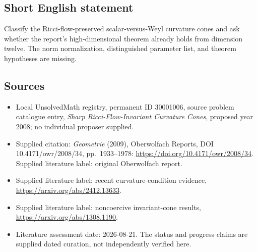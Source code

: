 \documentclass[11pt]{article}
\begin{document}
\subsection{Short English statement}
Classify the Ricci-flow-preserved scalar-versus-Weyl curvature cones and ask whether the report's high-dimensional theorem already holds from dimension twelve. The norm normalization, distinguished parameter list, and theorem hypotheses are missing.
\subsection{Sources}
\begin{itemize}\item Local UnsolvedMath registry, permanent ID 30001006, source problem catalogue entry, \emph{Sharp Ricci-Flow-Invariant Curvature Cones}, proposed year 2008; no individual proposer supplied.\item Supplied citation: \emph{Geometrie} (2009), Oberwolfach Reports, DOI 10.4171/owr/2008/34, pp.\ 1933--1978: \url{https://doi.org/10.4171/owr/2008/34}. Supplied literature label: original Oberwolfach report.\item Supplied literature label: recent curvature-condition evidence, \url{https://arxiv.org/abs/2412.13633}.\item Supplied literature label: noncoercive invariant-cone results, \url{https://arxiv.org/abs/1308.1190}.\item Literature assessment date: 2026-08-21. The status and progress claims are supplied dated curation, not independently verified here.\end{itemize}
\end{document}
